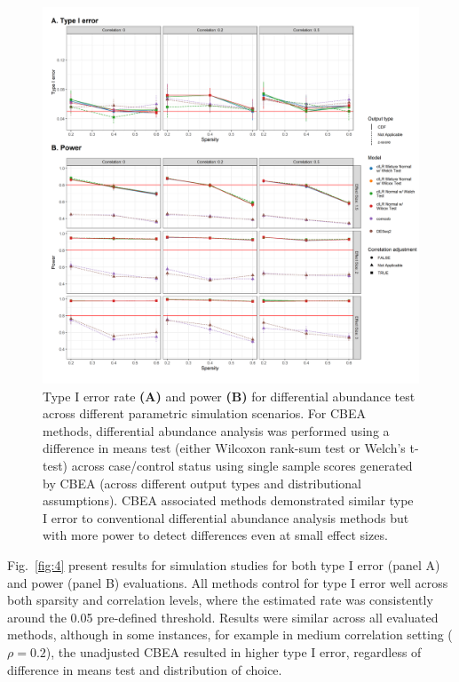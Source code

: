 \documentclass{article}
\begin{document}
\begin{figure}[!h]
    \centering
    \includegraphics[width = \textwidth]{figures/sim_diff_ab_comb.png}
    \caption{Type I error rate \textbf{(A)} and power \textbf{(B)} for differential abundance test across different parametric simulation scenarios. For CBEA methods, differential abundance analysis was performed using a difference in means test (either Wilcoxon rank-sum test or Welch's t-test) across case/control status using single sample scores generated by CBEA (across different output types and distributional assumptions). CBEA associated methods demonstrated similar type I error to conventional differential abundance analysis methods but with more power to detect differences even at small effect sizes.} 
    \label{fig:s2}
\end{figure}

Fig.~\ref{fig:4} present results for simulation studies for both type I error (panel A) and power (panel B) evaluations. All methods control for type I error well across both sparsity and correlation levels, where the estimated rate was consistently around the 0.05 pre-defined threshold. Results were similar across all evaluated methods, although in some instances, for example in medium correlation setting ($\rho = 0.2$), the unadjusted CBEA resulted in higher type I error, regardless of difference in means test and distribution of choice. 
\end{document}
